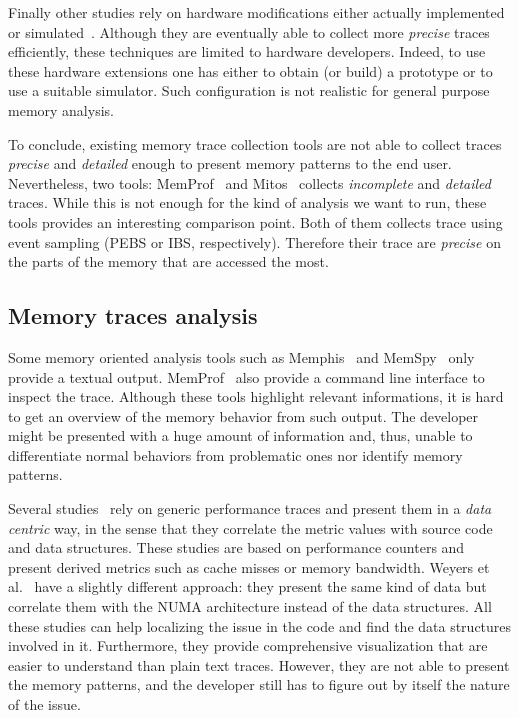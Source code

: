Finally other studies rely on hardware modifications either actually implemented or simulated~\cite{Bao08HMTT,Martonosi92MemSpy}.
Although they are eventually able to collect more \emph{precise} traces efficiently, these techniques are limited to hardware developers.
Indeed, to use these hardware extensions one has either to obtain (or build) a prototype or to use a suitable simulator.
Such configuration is not realistic for general purpose memory analysis.

To conclude, existing memory trace collection tools are not able to collect traces \emph{precise} and \emph{detailed} enough to present memory patterns to the end user.
Nevertheless, two tools: \gls{MemProf}~\cite{Lachaize12MemProf} and \gls{Mitos}~\cite{Gimenez14Dissecting} collects \emph{incomplete} and \emph{detailed} traces.
While this is not enough for the kind of analysis we want to run, these tools provides an interesting comparison point.
Both of them collects trace using event sampling (\gls{PEBS} or \gls{IBS}, respectively).
Therefore their trace are \emph{precise} on the parts of the memory that are accessed the most.

\subsection{Memory traces analysis}

Some memory oriented analysis tools such as \gls{Memphis}~\cite{McCurdy10Memphis} and \gls{MemSpy}~\cite{Martonosi92MemSpy} only provide a textual output.
\gls{MemProf}~\cite{Lachaize12MemProf} also provide a command line interface to inspect the trace.
Although these tools highlight relevant informations, it is hard to get an overview of the memory behavior from such output.
The developer might be presented with a huge amount of information and, thus, unable to differentiate normal behaviors from problematic ones nor identify memory patterns.

Several studies~\cite{DeRose01Hardware,DeRose02SIGMA,Bosch00Rivet} rely on generic performance traces and present them in a \emph{data centric} way, in the sense that they correlate the metric values with source code and data structures.
These studies are based on performance counters and present derived metrics such as cache misses or memory bandwidth.
Weyers et al.~\cite{Weyers14Visualization} have a slightly different approach: they present the same kind of data but correlate them with the \gls{NUMA} architecture instead of the data structures.
All these studies can help localizing the issue in the code and find the data structures involved in it.
Furthermore, they provide comprehensive visualization that are easier to understand than plain text traces.
However, they are not able to present the memory patterns, and the developer still has to figure out by itself the nature of the issue.

